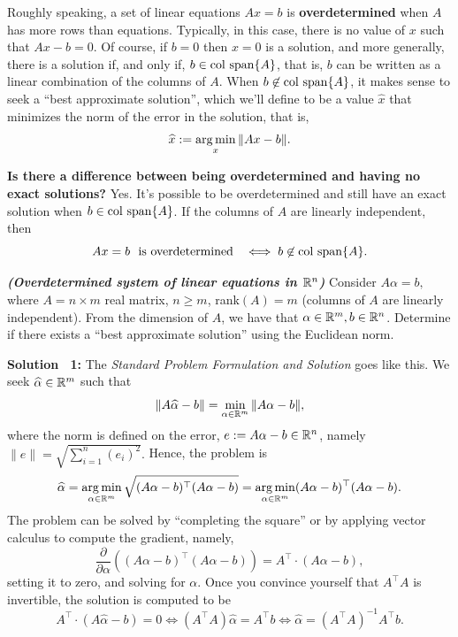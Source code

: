 \begin{tcolorbox}[title=\textbf{\Large Overdetermined Equations}]
Roughly speaking, a set of linear equations $Ax = b$ is \textbf{overdetermined} when $A$ has more rows than equations. Typically, in this case, there is no value of $x$ such that $Ax - b=0.$ Of course, if $b=0$ then $x=0$ is a solution, and more generally, there is a solution if, and only if, $b \in \mathrm{col~span} \{ A \}$, that is, $b$ can be written as a linear combination of the columns of $A$. When $b \not \in \mathrm{col~span} \{ A \}$, it makes sense to seek a ``best approximate solution'',  which we'll define to be a value $\widehat{x}$ that minimizes the norm of the error in the solution, that is, 
$$\widehat{x} := \operatorname*{arg\,min}_{x} \| A x -b \|. $$

\textbf{Is there a difference between being overdetermined and having no exact solutions?} Yes. It's possible to be overdetermined and still have an exact solution when $b \in \mathrm{col~span} \{ A \}$. If the columns of $A$ are linearly independent, then 
$$Ax=b ~~\text{is overdetermined}~~\iff b \not \in \mathrm{col~span} \{ A \}.$$

\end{tcolorbox}

\begin{example}  
\label{ex:OverDetermined}
\textbf{\emph{(Overdetermined system of linear equations in $\mathbb R ^n$)}}
Consider $A \alpha=b,$ 
where $A=n \times m$ real matrix,  $n \geq m$, rank$(A)=m$ (columns of $A$ are linearly independent). From the dimension of $A$, we have that $\alpha \in \mathbb R^m , b \in\mathbb R^n$. Determine if there exists a ``best approximate solution'' using the Euclidean norm. 
\end{example}

\textbf{Solution ~1:} The \emph{Standard Problem Formulation and Solution} goes like this. We seek $\widehat{\alpha} \in \mathbb R^m $ such that $$\| A \widehat{\alpha}-b \|=\min_{\alpha \in\mathbb R^m} \| A \alpha -b \|,$$
where the norm is defined on the error, $e:=A \alpha - b \in \mathbb R^n$, namely
$\|e\| =\sqrt{\sum\limits_{i=1}^n (e_i)^2}.$ Hence, the problem is \\
$$\widehat{\alpha} =\operatorname*{arg\,min}_{\alpha \in\mathbb R^m} \sqrt{(A \alpha -b)^\top (A \alpha -b)} = \operatorname*{arg\,min}_{\alpha \in\mathbb R^m} (A \alpha -b)^\top (A \alpha -b).$$
The problem can be solved by ``completing the square'' or by applying vector calculus to compute the gradient, namely, 
$$\frac{\partial }{\partial \alpha }\left( (A \alpha -b)^\top (A \alpha -b) \right) = A^\top \cdot(A \alpha - b),$$
setting it to zero, and solving for $\alpha$. Once you convince yourself that $A^\top A$ is invertible, the solution is computed to be 
$$ A^\top \cdot(A  \widehat{\alpha} - b) = 0 \iff (A^\top A)\widehat{\alpha} = A^\top b \iff  \widehat{\alpha} = (A^\top A)^{-1} A^\top b.$$


